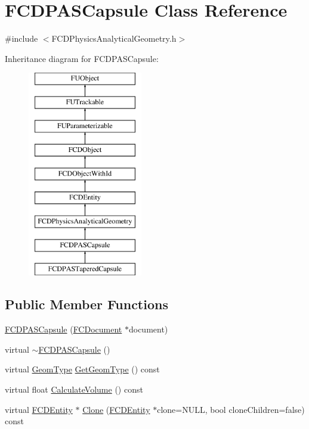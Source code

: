 \hypertarget{classFCDPASCapsule}{
\section{FCDPASCapsule Class Reference}
\label{classFCDPASCapsule}
}


{\ttfamily \#include $<$FCDPhysicsAnalyticalGeometry.h$>$}

Inheritance diagram for FCDPASCapsule:\begin{figure}[H]
\begin{center}
\leavevmode
\includegraphics[height=9.000000cm]{classFCDPASCapsule}
\end{center}
\end{figure}
\subsection*{Public Member Functions}
\begin{DoxyCompactItemize}
\item 
\hyperlink{classFCDPASCapsule_a02a0865e28bab31f5dce60e167895a1a}{FCDPASCapsule} (\hyperlink{classFCDocument}{FCDocument} $\ast$document)
\item 
virtual \hyperlink{classFCDPASCapsule_a872219e08c083b72f0f5e7d62c46cb7b}{$\sim$FCDPASCapsule} ()
\item 
virtual \hyperlink{classFCDPhysicsAnalyticalGeometry_a511583406e5c6a1bb5bd84c0453a452c}{GeomType} \hyperlink{classFCDPASCapsule_ad857a4a8159f4928d7260ed38fc46c22}{GetGeomType} () const 
\item 
virtual float \hyperlink{classFCDPASCapsule_a7aa385c582b13979465e5cb6e3b8665e}{CalculateVolume} () const 
\item 
virtual \hyperlink{classFCDEntity}{FCDEntity} $\ast$ \hyperlink{classFCDPASCapsule_a62a029b060c2bcf64cac963bf9896a92}{Clone} (\hyperlink{classFCDEntity}{FCDEntity} $\ast$clone=NULL, bool cloneChildren=false) const 
\end{DoxyCompactItemize}
